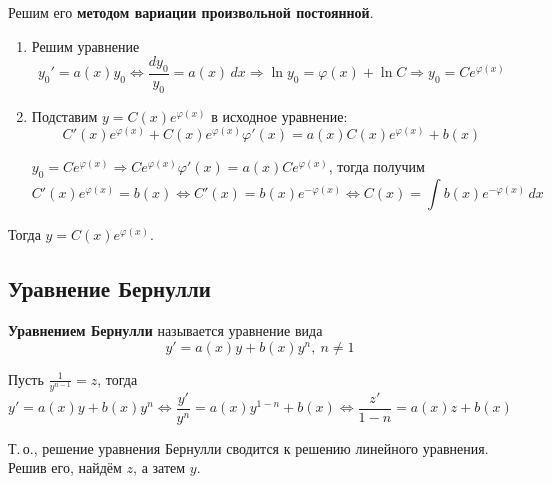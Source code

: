  Решим его \textbf{методом вариации произвольной постоянной}.
\begin{enumerate}
	\item Решим уравнение
	\begin{equation*}
	y_0' = a(x) y_0 \Leftrightarrow
	\frac{dy_0}{y_0} = a(x)\,dx \Rightarrow
	\ln y_0 = \varphi(x) + \ln C \Rightarrow
	y_0 = C e^{\varphi(x)}
	\end{equation*}
	
	\item Подставим $y = C(x) e^{\varphi(x)}$ в исходное уравнение:
	\begin{equation*}
	C'(x) e^{\varphi(x)} + C(x) e^{\varphi(x)} \varphi'(x) = a(x) C(x) e^{\varphi(x)} + b(x)
	\end{equation*}
	
	$y_0 = Ce^{\varphi(x)} \Rightarrow C e^{\varphi(x)} \varphi'(x) = a(x) C e^{\varphi(x)}$, тогда получим
	\begin{equation*}
	C'(x) e^{\varphi(x)} = b(x) \Leftrightarrow
	C'(x) = b(x) e^{-\varphi(x)} \Leftrightarrow
	C(x) = \int b(x) e^{-\varphi(x)}\,dx
	\end{equation*}
\end{enumerate}

Тогда $y = C(x) e^{\varphi(x)}$.

\subsection{Уравнение Бернулли}
 \textbf{Уравнением Бернулли} называется уравнение вида
\begin{equation*}
y' = a(x) y + b(x) y^n, \ n \neq 1
\end{equation*}

Пусть $\frac1{y^{n-1}} = z$, тогда
\begin{equation*}
y' = a(x) y + b(x) y^n \Leftrightarrow
\frac{y'}{y^n} = a(x) y^{1-n} + b(x) \Leftrightarrow
\frac{z'}{1 - n} = a(x) z + b(x)
\end{equation*}

Т.\,о., решение уравнения Бернулли сводится к решению линейного уравнения.
Решив его, найдём $z$, а затем $y$.